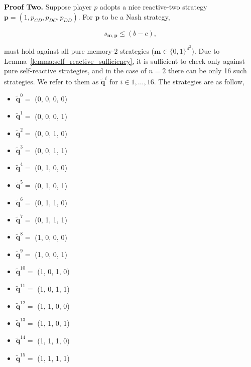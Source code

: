 \documentclass{article}
\theoremstyle{definition}
\begin{document}
{\bf Proof Two.} Suppose player $p$ adopts a nice reactive-two strategy
$\mathbf{p}\!=\!(1, p_{CD}, p_{DC}, p_{DD})$. For $\mathbf{p}$ to be a Nash
strategy,

\begin{equation}\label{Eq:NashReactive}
  s_{\mathbf{m}, \mathbf{p}} \leq (b - c),
\end{equation}

must hold against all pure memory-\(2\) strategies (\(\mathbf{m} \in \{0, 1\}^{4
^ 2}\)). Due to Lemma~\ref{lemma:self_reactive_sufficiency}, it is sufficient to
check only against pure self-reactive strategies, and in the case of $n=2$ there
can be only 16 such strategies. We refer to them as $\mathbf{\tilde{q}}^{i}$ for
$i \in 1, \dots, 16$. The strategies are as follow,

\begin{multicols}{4}
  \begin{itemize}
    \item $\mathbf{\tilde{q}}^{0} =$ (0, 0, 0, 0)
    \item $\mathbf{\tilde{q}}^{1} =$ (0, 0, 0, 1)
    \item $\mathbf{\tilde{q}}^{2} =$ (0, 0, 1, 0)
    \item $\mathbf{\tilde{q}}^{3} =$ (0, 0, 1, 1)
    \item $\mathbf{\tilde{q}}^{4} =$ (0, 1, 0, 0)
    \item $\mathbf{\tilde{q}}^{5} =$ (0, 1, 0, 1)
    \item $\mathbf{\tilde{q}}^{6} =$ (0, 1, 1, 0)
    \item $\mathbf{\tilde{q}}^{7} =$ (0, 1, 1, 1)
    \item $\mathbf{\tilde{q}}^{8} =$ (1, 0, 0, 0)
    \item $\mathbf{\tilde{q}}^{9} =$ (1, 0, 0, 1)
    \item $\mathbf{\tilde{q}}^{10} =$ (1, 0, 1, 0)
    \item $\mathbf{\tilde{q}}^{11} =$ (1, 0, 1, 1)
    \item $\mathbf{\tilde{q}}^{12} =$ (1, 1, 0, 0)
    \item $\mathbf{\tilde{q}}^{13} =$ (1, 1, 0, 1)
    \item $\mathbf{\tilde{q}}^{14} =$ (1, 1, 1, 0)
    \item $\mathbf{\tilde{q}}^{15} =$ (1, 1, 1, 1)
  \end{itemize}
\end{multicols}
\end{document}
